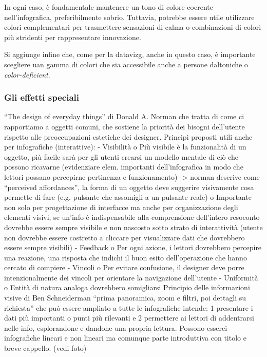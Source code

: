 \bigskip
\noindent In ogni caso, è fondamentale mantenere un tono di colore coerente nell'infografica, preferibilmente sobrio. Tuttavia, potrebbe essere utile utilizzare colori 
complementari per trasmettere sensazioni di calma o combinazioni di colori più stridenti per rappresentare innovazione.

Si aggiunge infine che, come per la \gls{datavizg}, anche in questo caso, è importante scegliere uan gamma di colori che sia accessibile anche a persone daltoniche o \emph{color-deficient}.


\subsubsection{Gli effetti speciali}
“The design of everyday things” di Donald A. Norman che tratta di come ci rapportiamo a oggetti comuni, che sostiene la priorità dei bisogni dell'utente rispetto alle preoccupazioni estetiche dei designer. Principi proposti utili anche per infografiche (interattive):
-	Visibilità
o	Più visibile è la funzionalità di un oggetto, più facile sarà per gli utenti crearsi un modello mentale di ciò che possono ricavarne (evidenziare elem. importanti dell'infografica in modo che lettori possano percepirne pertinenza e funzionamento) -> norman descrive come “perceived affordances”, la forma di un oggetto deve suggerire visivamente cosa permette di fare (e.g. pulsante che assomigli a un pulsante reale)
o	Importante non solo per progettazione di interfacce ma anche per organizzazione degli elementi visivi, se un'info è indispensabile alla comprensione dell'intero resoconto dovrebbe essere sempre visibile e non nascosto sotto strato di interattività (utente non dovrebbe essere costretto a cliccare per visualizzare dati che dovrebbero essere sempre visibili)
-	Feedback
o	Per ogni azione, i lettori dovrebbero percepire una reazione, una risposta che indichi il buon esito dell'operazione che hanno cercato di compiere
-	Vincoli
o	Per evitare confusione, il designer deve porre intenzionalmente dei vincoli per orientare la navigazione dell'utente 
-	Uniformità
o	Entità di natura analoga dovrebbero somigliarsi
Principio delle informazioni visive di Ben Schneiderman “prima panoramica, zoom e filtri, poi dettagli su richiesta” che può essere ampliato a tutte le infografiche intende: 1 presentare i dati più importanti o punti più rilevanti e 2 permettere ai lettori di addentrarsi nelle info, esplorandone e dandone una propria lettura. Possono esserci infografiche lineari e non lineari ma comunque parte introduttiva con titolo e breve cappello. (vedi foto)
